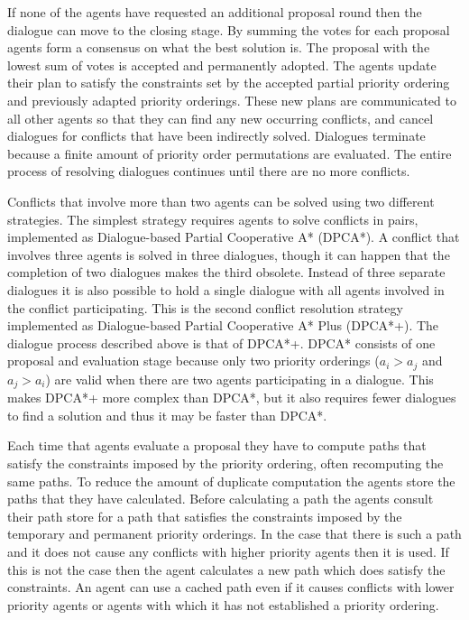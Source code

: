 If none of the agents have requested an additional proposal round then the 
dialogue can move to the closing stage. 
By summing the votes for each proposal agents form a consensus on what the best 
solution is. The 
proposal with the lowest sum of votes is accepted and permanently adopted.
The agents update their plan to 
satisfy the constraints set by the accepted partial priority ordering and 
previously adapted priority orderings. These new 
plans are communicated to all other agents so that they can find any new 
occurring conflicts, and cancel dialogues for conflicts that have been 
indirectly solved. Dialogues terminate because a finite amount of priority 
order permutations are evaluated. The entire process of 
resolving dialogues 
continues until there are no more conflicts.

Conflicts that involve more than two agents can be solved using two different
strategies. The simplest strategy requires agents to solve conflicts in pairs, implemented 
as Dialogue-based Partial Cooperative A* (DPCA*). A conflict that involves
three agents is solved in three dialogues, though it can happen that the 
completion of two dialogues makes the third obsolete. 
Instead of three 
separate dialogues it is also possible to hold a single dialogue with all 
agents involved in the conflict participating. This is the second conflict resolution strategy implemented as Dialogue-based Partial Cooperative A* Plus (DPCA*+). The dialogue process 
described above is that of DPCA*+. DPCA* consists of one proposal and 
evaluation stage because only two priority orderings ($a_i > a_j$ and $a_j > 
a_i$) 
are valid when there 
are two agents participating in a dialogue.
This makes DPCA*+ more complex than DPCA*, but it also requires fewer dialogues 
to find a solution and thus it may be faster than DPCA*.

Each time that agents evaluate a proposal they have to compute paths that
satisfy the constraints imposed by the priority ordering, often recomputing
the same paths. To reduce the amount of duplicate computation the
agents store the paths that they have calculated. Before calculating a path
the agents consult their path store for a path that satisfies the
constraints imposed by the temporary and permanent priority orderings. In the 
case
that there is such a path and it does not cause any conflicts with higher
priority agents then it is used. If this is not the case then the agent
calculates a new path which does satisfy the constraints. An agent can use a 
cached path even if it causes
conflicts with lower priority agents or agents with which it has not
established a priority ordering.

